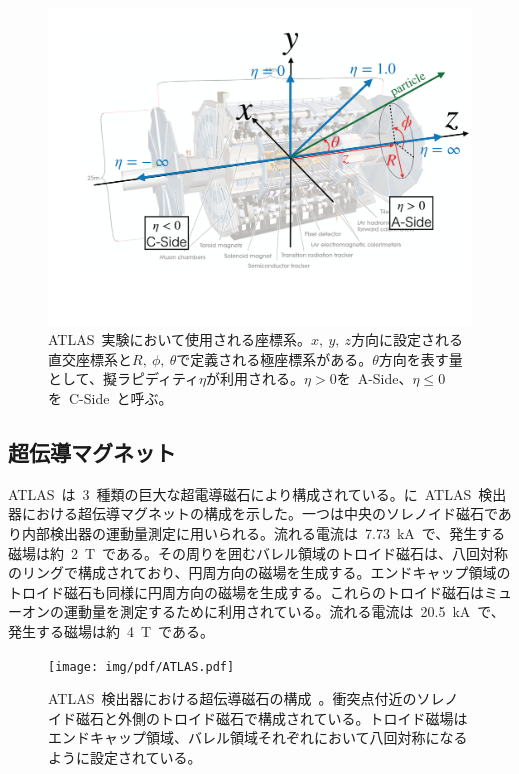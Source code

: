 \begin{figure}[H]
    \centering  
    \includegraphics[width=\textwidth,page=1]{img/pdf/cood.pdf}
    \caption[ATLAS~実験において使用される座標系]{ATLAS~実験において使用される座標系。$x,~y,~z$方向に設定される直交座標系と$R,~\phi,~\theta$で定義される極座標系がある。$\theta$方向を表す量として、擬ラピディティ$\eta$が利用される。$\eta>0$を~A-Side、$\eta{\leq}0$を~C-Side~と呼ぶ。}\label{fig:cood}
\end{figure}

\subsection{超伝導マグネット}
ATLAS~は~3~種類の巨大な超電導磁石により構成されている。に~ATLAS~検出器における超伝導マグネットの構成を示した。一つは中央のソレノイド磁石であり内部検出器の運動量測定に用いられる。流れる電流は~7.73~kA~で、発生する磁場は約~2~T~である。その周りを囲むバレル領域のトロイド磁石は、八回対称のリングで構成されており、円周方向の磁場を生成する。エンドキャップ領域のトロイド磁石も同様に円周方向の磁場を生成する。これらのトロイド磁石はミューオンの運動量を測定するために利用されている。流れる電流は~20.5~kA~で、発生する磁場は約~4~T~である。

\begin{figure}[H]
        \centering   
        \texttt{[image: img/pdf/ATLAS.pdf]}
        \caption[ATLAS~検出器における超伝導磁石の構成]{ATLAS~検出器における超伝導磁石の構成~\cite{TR:01}。衝突点付近のソレノイド磁石と外側のトロイド磁石で構成されている。トロイド磁場はエンドキャップ領域、バレル領域それぞれにおいて八回対称になるように設定されている。}\label{fig:mag}
\end{figure}


